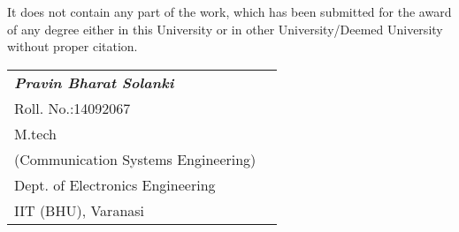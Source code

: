It does not contain any part of the work, which has been submitted for the award of any degree either in this University or in other University/Deemed University without proper citation.
\begin{flushright}
\begin{minipage}[t]{0.45\linewidth}
\begin{tabular}{ll}
\textbf{\textit{Pravin Bharat Solanki}}\\
 Roll. No.:14092067\\
 M.tech\\ 
(Communication Systems Engineering)\\
Dept. of Electronics Engineering\\
IIT (BHU), Varanasi
\end{tabular}
\end{minipage}
\end{flushright}
\thispagestyle{empty}





\vspace{.5cm}
\begin{figure}[H]
\centering
\vspace{4.5cm}

\vspace{.5cm}
\label{fig1}
\end{figure}
\vspace{1.5cm}
\thispagestyle{empty}
\begin{center}
\textbf{\textit{{}}}\\[2pc]
\textbf{\textit{{}}}\\[2pc]
\textbf{\textit{{}}}\\
\end{center}
\vspace{1.5cm}
\begin{figure}[H]
\centering
\vspace{1.5cm}

\vspace{1.5cm}
\label{fig1}
\end{figure}
\vspace{1.5cm}
\thispagestyle{empty}
\thispagestyle{empty}